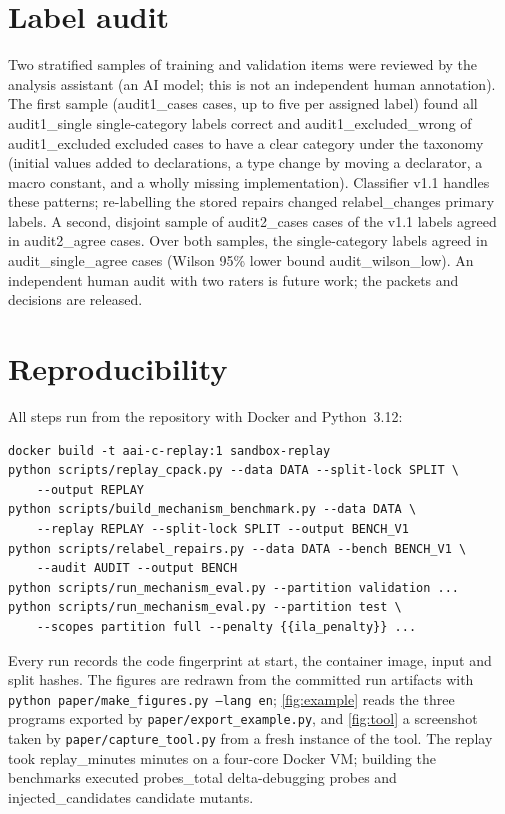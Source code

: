\section{Label audit}\label{app:audit}
Two stratified samples of training and validation items were reviewed by the analysis assistant (an AI model; this is not an independent human annotation). The first sample ({{audit1_cases}} cases, up to five per assigned label) found all {{audit1_single}} single-category labels correct and {{audit1_excluded_wrong}} of {{audit1_excluded}} excluded cases to have a clear category under the taxonomy (initial values added to declarations, a type change by moving a declarator, a macro constant, and a wholly missing implementation). Classifier v1.1 handles these patterns; re-labelling the stored repairs changed {{relabel_changes}} primary labels. A second, disjoint sample of {{audit2_cases}} cases of the v1.1 labels agreed in {{audit2_agree}} cases. Over both samples, the single-category labels agreed in {{audit_single_agree}} cases (Wilson 95\% lower bound {{audit_wilson_low}}). An independent human audit with two raters is future work; the packets and decisions are released.

\section{Reproducibility}\label{app:repro}
All steps run from the repository with Docker and Python~3.12:
\begin{verbatim}
docker build -t aai-c-replay:1 sandbox-replay
python scripts/replay_cpack.py --data DATA --split-lock SPLIT \
    --output REPLAY
python scripts/build_mechanism_benchmark.py --data DATA \
    --replay REPLAY --split-lock SPLIT --output BENCH_V1
python scripts/relabel_repairs.py --data DATA --bench BENCH_V1 \
    --audit AUDIT --output BENCH
python scripts/run_mechanism_eval.py --partition validation ...
python scripts/run_mechanism_eval.py --partition test \
    --scopes partition full --penalty {{ila_penalty}} ...
\end{verbatim}
Every run records the code fingerprint at start, the container image, input and split hashes. The figures are redrawn from the committed run artifacts with \texttt{python paper/make\_figures.py --lang en}; \cref{fig:example} reads the three programs exported by \texttt{paper/export\_example.py}, and \cref{fig:tool} a screenshot taken by \texttt{paper/capture\_tool.py} from a fresh instance of the tool. The replay took {{replay_minutes}} minutes on a four-core Docker VM; building the benchmarks executed {{probes_total}} delta-debugging probes and {{injected_candidates}} candidate mutants.

